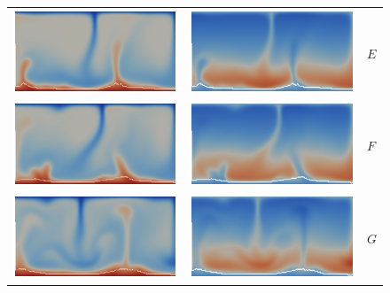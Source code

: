 \begin{figure}[htbp]
\begin{center}
\begin{tabular}{c c l}
\includegraphics[width=0.45\columnwidth]{chapters/vynnytska/figures/tmE.png} &
\includegraphics[width=0.45\columnwidth]{chapters/vynnytska/figures/visE.png} & $E$ \\
\includegraphics[width=0.45\columnwidth]{chapters/vynnytska/figures/tmF.png} &
\includegraphics[width=0.45\columnwidth]{chapters/vynnytska/figures/visF.png} & $F$ \\
\includegraphics[width=0.45\columnwidth]{chapters/vynnytska/figures/tmG.png} &
\includegraphics[width=0.45\columnwidth]{chapters/vynnytska/figures/visG.png} & $G$ \\

\end{tabular}
\end{center}
\end{figure}
